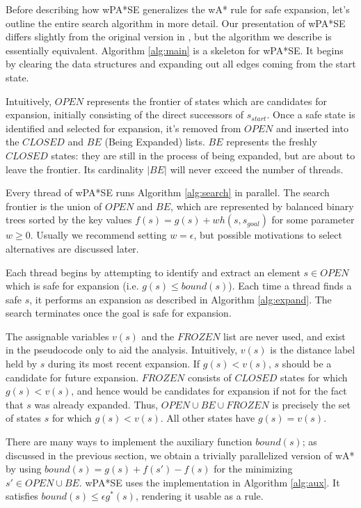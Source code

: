 \documentclass[letterpaper]{article}
\begin{document}
Before describing how wPA*SE generalizes the wA* rule for safe expansion, let's outline the entire search algorithm in more detail. Our presentation of wPA*SE differs slightly from the original version in \cite{phillips2014pa}, but the algorithm we describe is essentially equivalent. Algorithm \ref{alg:main} is a skeleton for wPA*SE. It begins by clearing the data structures and expanding out all edges coming from the start state.

Intuitively, $OPEN$ represents the frontier of states which are candidates for expansion, initially consisting of the direct successors of $s_{start}$. Once a safe state is identified and selected for expansion, it's removed from $OPEN$ and inserted into the $CLOSED$ and $BE$ (Being Expanded) lists. $BE$ represents the freshly $CLOSED$ states: they are still in the process of being expanded, but are about to leave the frontier. Its cardinality $|BE|$ will never exceed the number of threads.

Every thread of wPA*SE runs Algorithm \ref{alg:search} in parallel. The search frontier is the union of $OPEN$ and $BE$, which are represented by balanced binary trees sorted by the key values $f(s) = g(s) + wh(s,s_{goal})$ for some parameter $w\ge 0$. Usually we recommend setting $w=\epsilon$, but possible motivations to select alternatives are discussed later.

Each thread begins by attempting to identify and extract an element $s\in OPEN$ which is safe for expansion (i.e. $g(s)\le bound(s)$). Each time a thread finds a safe $s$, it performs an expansion as described in Algorithm \ref{alg:expand}. The search terminates once the goal is safe for expansion.

The assignable variables $v(s)$ and the $FROZEN$ list are never used, and exist in the pseudocode only to aid the analysis. Intuitively, $v(s)$ is the distance label held by $s$ during its most recent expansion. If $g(s) < v(s)$, $s$ should be a candidate for future expansion. $FROZEN$ consists of $CLOSED$ states for which $g(s) < v(s)$, and hence would be candidates for expansion if not for the fact that $s$ was already expanded. Thus, $OPEN\cup BE\cup FROZEN$ is precisely the set of states $s$ for which $g(s) < v(s)$. All other states have $g(s) = v(s)$.

There are many ways to implement the auxiliary function $bound(s)$; as discussed in the previous section, we obtain a trivially parallelized version of wA* by using $bound(s) = g(s) + f(s') - f(s)$ for the minimizing $s'\in OPEN \cup BE$. wPA*SE uses the implementation in Algorithm \ref{alg:aux}. It satisfies $bound(s) \le \epsilon g^*(s)$, rendering it usable as a rule.
\end{document}
